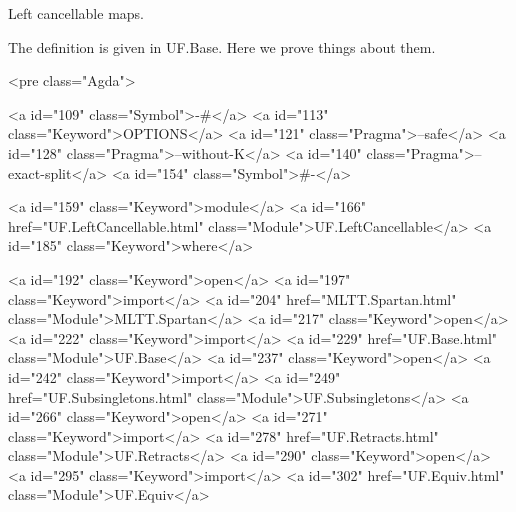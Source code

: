 Left cancellable maps.

The definition is given in UF.Base. Here we prove things about them.

<pre class="Agda">

<a id="109" class="Symbol">{-#</a> <a id="113" class="Keyword">OPTIONS</a> <a id="121" class="Pragma">--safe</a> <a id="128" class="Pragma">--without-K</a> <a id="140" class="Pragma">--exact-split</a> <a id="154" class="Symbol">#-}</a>

<a id="159" class="Keyword">module</a> <a id="166" href="UF.LeftCancellable.html" class="Module">UF.LeftCancellable</a> <a id="185" class="Keyword">where</a>

<a id="192" class="Keyword">open</a> <a id="197" class="Keyword">import</a> <a id="204" href="MLTT.Spartan.html" class="Module">MLTT.Spartan</a>
<a id="217" class="Keyword">open</a> <a id="222" class="Keyword">import</a> <a id="229" href="UF.Base.html" class="Module">UF.Base</a>
<a id="237" class="Keyword">open</a> <a id="242" class="Keyword">import</a> <a id="249" href="UF.Subsingletons.html" class="Module">UF.Subsingletons</a>
<a id="266" class="Keyword">open</a> <a id="271" class="Keyword">import</a> <a id="278" href="UF.Retracts.html" class="Module">UF.Retracts</a>
<a id="290" class="Keyword">open</a> <a id="295" class="Keyword">import</a> <a id="302" href="UF.Equiv.html" class="Module">UF.Equiv</a>

